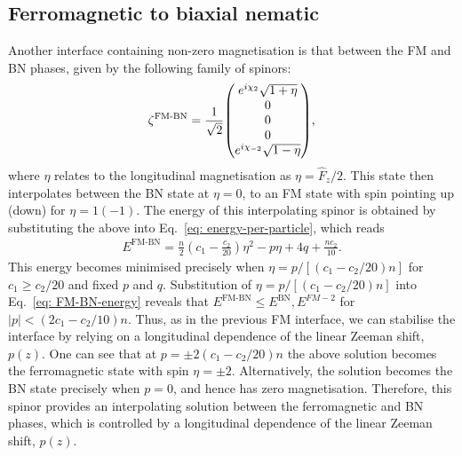 \subsection{Ferromagnetic to biaxial nematic}
Another interface containing non-zero magnetisation is that between the FM and
BN phases, given by the following family of spinors:
\begin{align}\label{eq: FM-BN-interpolating-spinor}
    \zeta^\text{FM-BN} = \frac{1}{\sqrt{2}}\mqty(
    e^{i\chi_2} \sqrt{1 + \eta} \\
    0 \\
    0 \\
    0 \\
    e^{i\chi_{-2}} \sqrt{1 - \eta}),
\end{align}
where \(\eta \) relates to the longitudinal magnetisation as \(\eta =
\hat{F}_z / 2\).
This state then interpolates between the BN state at \(\eta = 0\), to an FM
state with spin pointing up (down) for \(\eta = 1 (-1)\).
The energy of this interpolating spinor is obtained by substituting the above
into Eq.~\eqref{eq: energy-per-particle}, which reads
\begin{align}\label{eq: FM-BN-energy}
    E^\text{FM-BN} = \frac{n}{2}\left(c_1-\frac{c_2}{20}\right)\eta^2
    - p \eta + 4q + \frac{nc_2}{10}.
\end{align}
This energy becomes minimised precisely when \(\eta = p / [(c_1-c_2/20)n]\) for
\(c_1 \geq c_2/20\) and fixed \(p\) and \(q\).
Substitution of \(\eta = p / [(c_1-c_2/20)n]\) into Eq.~\eqref{eq: FM-BN-energy}
reveals that \(E^\text{FM-BN} \leq E^\text{BN},
E^{FM-2}\) for \(|p| < (2c_1-c_2/10)n\).
Thus, as in the previous FM interface, we can stabilise the interface by relying
on a longitudinal dependence of the linear Zeeman shift, \(p(z)\).
One can see that at \(p = \pm 2(c_1-c_2/20)n\) the above solution becomes
the ferromagnetic state with spin \(\eta = \pm 2\).
Alternatively, the solution becomes the BN state precisely when \(p=0\), and
hence has zero magnetisation.
Therefore, this spinor provides an interpolating solution between the
ferromagnetic and BN phases, which is controlled by a longitudinal dependence of
the linear Zeeman shift, \(p(z)\).

